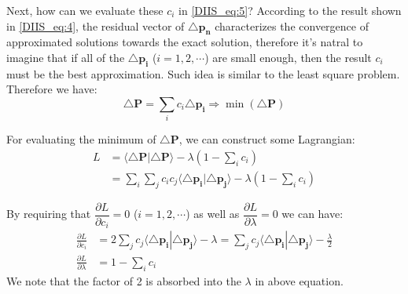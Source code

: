 Next, how can we evaluate these $c_{i}$ in \ref{DIIS_eq:5}? According to the result
shown in \ref{DIIS_eq:4}, the residual vector of $\triangle \mathbf{p_{n}}$ characterizes
the convergence of approximated solutions towards the exact solution, therefore it's 
natral to imagine that if all of the $\triangle \mathbf{p_{i}}$ ($i=1,2,\cdots$) are small
enough, then the result $c_{i}$ must be the best approximation. Such idea is similar to the 
least square problem. Therefore we have:
\begin{equation}
\label{DIIS_eq:8}
 \triangle \mathbf{P} = \sum_{i}c_{i}\triangle \mathbf{p_{i}} 
 \Rightarrow \min(\triangle \mathbf{P})
\end{equation}

For evaluating the minimum of $\triangle \mathbf{P}$, we can construct some Lagrangian:
\begin{align}
 \label{DIIS_eq:9}
 L &= \langle \triangle \mathbf{P} |\triangle \mathbf{P} \rangle - 
 \lambda(1-\sum_{i}c_{i}) \nonumber \\
   &= \sum_{i}\sum_{j}c_{i}c_{j}\langle\triangle \mathbf{p_{i}}|\triangle\mathbf{p_{j}}\rangle - 
   \lambda(1-\sum_{i}c_{i})
\end{align}

By requiring that $\dfrac{\partial L}{\partial c_{i}} = 0$ ($i = 1, 2, \cdots$) 
as well as $\dfrac{\partial L}{\partial \lambda} = 0$ we can have:
\begin{align}
 \frac{\partial L}{\partial c_{i}} &= 
 2\sum_{j}c_{j}\langle\triangle \mathbf{p_{i}}|\triangle\mathbf{p_{j}}\rangle - \lambda
 = \sum_{j}c_{j}\langle\triangle \mathbf{p_{i}}|\triangle\mathbf{p_{j}}\rangle - \frac{\lambda}{2}
 \nonumber \\
 \frac{\partial L}{\partial \lambda} &= 
 1-\sum_{i}c_{i}
\end{align}
We note that the factor of 2 is absorbed into the $\lambda$ in above equation.


